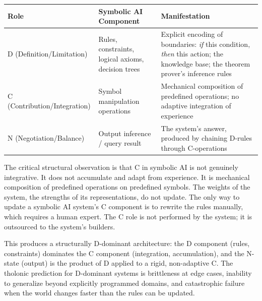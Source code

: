 \documentclass[12pt]{article}
\begin{document}
\begin{longtable}[]{@{}
  >{\raggedright\arraybackslash}p{}
  >{\raggedright\arraybackslash}p{}
  >{\raggedright\arraybackslash}p{}@{}}
\toprule\noalign{}
\begin{minipage}[b]{\linewidth}\raggedright
Role
\end{minipage} & \begin{minipage}[b]{\linewidth}\raggedright
Symbolic AI Component
\end{minipage} & \begin{minipage}[b]{\linewidth}\raggedright
Manifestation
\end{minipage} \\
\midrule\noalign{}
\endhead
\bottomrule\noalign{}
\endlastfoot
D (Definition/Limitation) & Rules, constraints, logical axioms, decision
trees & Explicit encoding of boundaries: \emph{if} this condition,
\emph{then} this action; the knowledge base; the theorem prover's
inference rules \\
C (Contribution/Integration) & Symbol manipulation operations &
Mechanical composition of predefined operations; no adaptive integration
of experience \\
N (Negotiation/Balance) & Output inference / query result & The system's
answer, produced by chaining D-rules through C-operations \\
\end{longtable}

The critical structural observation is that C in symbolic AI is not
genuinely integrative. It does not accumulate and adapt from experience.
It is mechanical composition of predefined operations on predefined
symbols. The weights of the system, the strengths of its
representations, do not update. The only way to update a symbolic AI
system's C component is to rewrite the rules manually, which requires a
human expert. The C role is not performed by the system; it is
outsourced to the system's builders.

This produces a structurally D-dominant architecture: the D component
(rules, constraints) dominates the C component (integration,
accumulation), and the N-state (output) is the product of D applied to a
rigid, non-adaptive C. The tholonic prediction for D-dominant systems is
brittleness at edge cases, inability to generalize beyond explicitly
programmed domains, and catastrophic failure when the world changes
faster than the rules can be updated.
\end{document}
